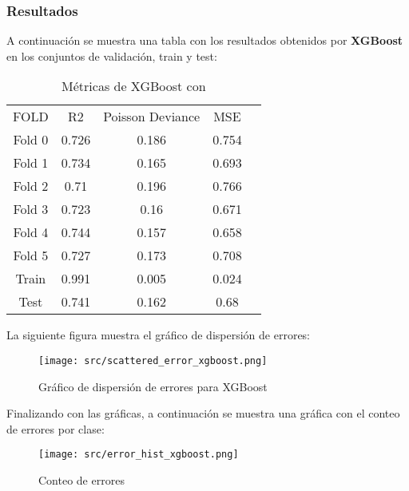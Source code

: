 \subsubsection*{Resultados}
A continuación se muestra una tabla con los resultados obtenidos por \textbf{XGBoost} en los conjuntos de validación, train y test:
\begin{table}[H]
	\centering
	\begin{tabular}{|c|c|c|c|c|}
		\cline{1-4}
		FOLD   & R2    & Poisson Deviance & MSE   \\ \cline{1-4}
		Fold 0 & 0.726 & 0.186            & 0.754 \\ \cline{1-4}
		Fold 1 & 0.734 & 0.165            & 0.693 \\ \cline{1-4}
		Fold 2 & 0.71  & 0.196            & 0.766 \\ \cline{1-4}
		Fold 3 & 0.723 & 0.16             & 0.671 \\ \cline{1-4}
		Fold 4 & 0.744 & 0.157            & 0.658 \\ \cline{1-4}
		Fold 5 & 0.727 & 0.173            & 0.708 \\ \cline{1-4}
		Train  & 0.991 & 0.005            & 0.024 \\ \cline{1-4}
		Test   & 0.741 & 0.162            & 0.68  \\ \cline{1-4}
	\end{tabular}
	\caption{Métricas de XGBoost con}
	\label{tab:xgboost}
\end{table}
La siguiente figura muestra el gráfico de dispersión de errores:
\begin{figure}[H]
	\centering
	\texttt{[image: src/scattered\_error\_xgboost.png]}
	\caption{Gráfico de dispersión de errores para XGBoost}
	\label{fig:xgboost_scattered}
\end{figure}
Finalizando con las gráficas, a continuación se muestra una gráfica con el conteo de errores por clase:
\begin{figure}[H]
	\centering
	\texttt{[image: src/error\_hist\_xgboost.png]}
	\caption{Conteo de errores}
	\label{fig:xgboost_error_plot}
\end{figure}

